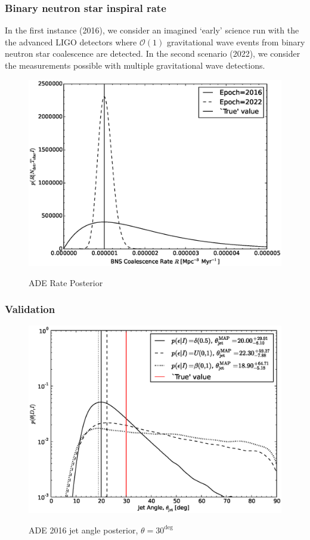 \documentclass[twocolumn,nofootinbib]{revtex4-1}
\begin{document}
\subsubsection{Binary neutron star inspiral rate}

In the first instance (2016), we consider an imagined `early' science run with the the
advanced LIGO detectors where ${\mathcal O}(1)$ gravitational wave events from
binary neutron star coalescence are detected.  In the second scenario (2022), we
consider the measurements possible with multiple gravitational wave detections.

\begin{figure}
\centering
{\includegraphics[width=\linewidth]{aligo_rate_re.eps}}
\caption{ADE Rate Posterior\label{fig:aligorate}}
\end{figure}


\subsubsection{Validation}

\begin{figure}
\centering
{\includegraphics[width=\linewidth]{jet_angle_posterior_aligo_2016.eps}}
\caption{ADE 2016 jet angle posterior, 
$\theta = 30^{\deg}$\label{fig:njjetposterio2016}}
\end{figure}
\end{document}
